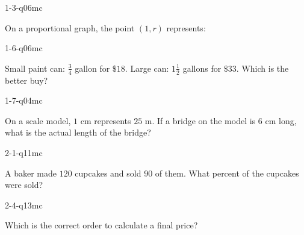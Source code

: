 
\begin{practiceQuestion}{1-3-q06}{mc}
\begin{questionText}
On a proportional graph, the point $(1, r)$ represents:
\end{questionText}
\end{practiceQuestion}

\begin{practiceQuestion}{1-6-q06}{mc}
\begin{questionText}
Small paint can: $\frac{3}{4}$ gallon for $\$18$. Large can: $1\frac{1}{2}$ gallons for $\$33$. Which is the better buy?
\end{questionText}
\end{practiceQuestion}

\begin{practiceQuestion}{1-7-q04}{mc}
\begin{questionText}
On a scale model, $1$ cm represents $25$ m. If a bridge on the model is $6$ cm long, what is the actual length of the bridge?
\end{questionText}
\end{practiceQuestion}

\begin{practiceQuestion}{2-1-q11}{mc}
\begin{questionText}
A baker made $120$ cupcakes and sold $90$ of them. What percent of the cupcakes were sold?
\end{questionText}
\end{practiceQuestion}

\begin{practiceQuestion}{2-4-q13}{mc}
\begin{questionText}
Which is the correct order to calculate a final price?
\end{questionText}
\end{practiceQuestion}

